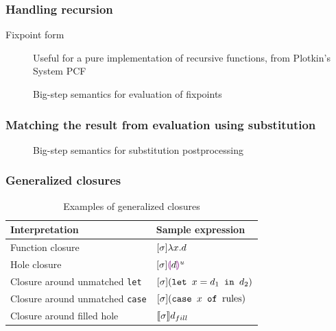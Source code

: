 \documentclass{beamer}
\begin{document}
\begin{frame}
  \frametitle{Handling recursion}

  \begin{description}
  \item[Fixpoint form] Useful for a pure implementation of recursive functions, from Plotkin's System PCF
  \end{description}
  
  \begin{figure}
    \footnotesize
    \centering
    
    \caption{Big-step semantics for evaluation of fixpoints}
    \label{fig:fixpoint-rules}
  \end{figure}
\end{frame}

\begin{frame}
  \frametitle{Matching the result from evaluation using substitution}

  \begin{figure}
    \centering
    \footnotesize
    \renewcommand{\judgboxfontsize}{\footnotesize}
    
    \caption{Big-step semantics for substitution postprocessing}
    \label{fig:pplc-rules}
  \end{figure}
\end{frame}

\begin{frame}
  \frametitle{Generalized closures}

  \begin{table}
    \centering
    \begin{tabular}{l|l}
      \hline
      Interpretation & Sample expression \\
      \hline\hline
      Function closure & $[\sigma]\lambda x.d$ \\
      Hole closure & $[\sigma]\textcolor{violet}{\llparenthesis} d\textcolor{violet}{\rrparenthesis}^u$ \\
      Closure around unmatched \texttt{let} & $[\sigma](\texttt{let }x=d_1\texttt{ in }d_2)$ \\
      Closure around unmatched \texttt{case} & $[\sigma](\texttt{case }x\texttt{ of }\text{rules})$ \\
      Closure around filled hole & $\llbracket\sigma\rrbracket d_{fill}$ \\
      \hline\hline
    \end{tabular}
    \caption{Examples of generalized closures}
    \label{tab:generaized-closures-examples}
  \end{table}

\end{frame}
\end{document}
